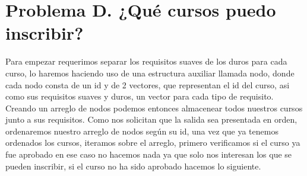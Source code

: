 \documentclass[12pt]{article}
\begin{document}
    \newpage %

    \section*{Problema D. ¿Qué cursos puedo inscribir?}

    \hspace{10mm}Para empezar requerimos separar los requisitos suaves de los duros para cada curso, lo haremos haciendo uso de una
    estructura auxiliar llamada nodo, donde cada nodo consta de un id y de 2 vectores, que representan el id del curso, asi como sus
    requisitos suaves y duros, un vector para cada tipo de requisito. Creando un arreglo de nodos podemos entonces almacenear todos
    nuestros cursos junto a sus requisitos. Como nos solicitan que la salida sea presentada
    en orden, ordenaremos nuestro arreglo de nodos según su id, una vez que ya tenemos ordenados los cursos, iteramos sobre 
    el arreglo, primero verificamos si el curso ya fue aprobado en ese caso no hacemos nada ya que solo nos interesan los que 
    se pueden inscribir, si el curso no ha sido aprobado hacemos lo siguiente.
        
\end{document}
